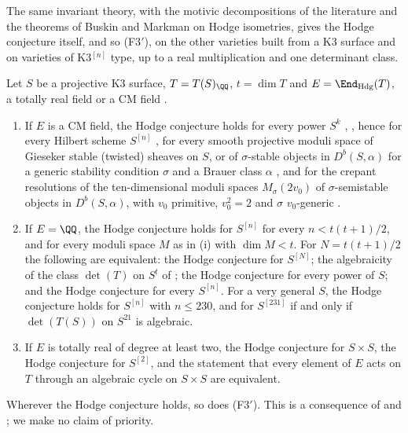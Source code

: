The same invariant theory, with the motivic decompositions of the
literature and the theorems of Buskin and Markman on Hodge isometries, gives
the Hodge conjecture itself, and so \textup{(F3$'$)}, on the other varieties
built from a K3 surface and on varieties of K3$^{[n]}$ type, up to a real
multiplication and one determinant class.

\begin{proposition}\label{prop:k3powers}
Let $S$ be a projective K3 surface, $T=T(S)_{\QQ}$, $t=\dim T$ and
$E=\End_{\mathrm{Hdg}}(T)$, a totally real field or a CM field \cite{Zar83}.
\begin{enumerate}[label=\textup{(\roman*)},leftmargin=2.6em,itemsep=2pt]
\item If $E$ is a CM field, the Hodge conjecture holds for every power
  $S^{k}$ \cite[Theorem~5.4]{RM08}, \cite{Bus19}, hence for every Hilbert
  scheme $S^{[n]}$ \cite{dCM02}, for every smooth projective moduli space of
  Gieseker stable (twisted) sheaves on $S$, or of $\sigma$-stable objects in
  $D^{b}(S,\alpha)$ for a generic stability condition $\sigma$ and a Brauer
  class $\alpha$ \cite[Theorem~0.1, Remark~2.1]{Bue20}, and for the crepant
  resolutions of the ten-dimensional moduli spaces $M_{\sigma}(2v_{0})$ of
  $\sigma$-semistable objects in $D^{b}(S,\alpha)$, with $v_{0}$ primitive,
  $v_{0}^{2}=2$ and $\sigma$ $v_{0}$-generic \cite[Theorem~1.3]{FFZ21}.
\item If $E=\QQ$, the Hodge conjecture holds for $S^{[n]}$ for every
  $n<t(t+1)/2$, and for every moduli space $M$ as in \textup{(i)} with
  $\dim M<t$. For $N=t(t+1)/2$ the following are equivalent: the Hodge
  conjecture for $S^{[N]}$; the algebraicity of the class $\det(T)$ on $S^{t}$
  of ; the Hodge conjecture for every power of $S$; and
  the Hodge conjecture for every $S^{[n]}$. For a very general $S$, the Hodge
  conjecture holds for $S^{[n]}$ with $n\le230$, and for $S^{[231]}$ if and
  only if $\det(T(S))$ on $S^{21}$ is algebraic.
\item If $E$ is totally real of degree at least two, the Hodge conjecture for
  $S\times S$, the Hodge conjecture for $S^{[2]}$, and the statement that
  every element of $E$ acts on $T$ through an algebraic cycle on $S\times S$
  are equivalent.
\end{enumerate}
Wherever the Hodge conjecture holds, so does \textup{(F3$'$)}. This is a
consequence of \cite{RM08,Bus19,dCM02,Bue20,FFZ21} and
; we make no claim of priority.
\end{proposition}

